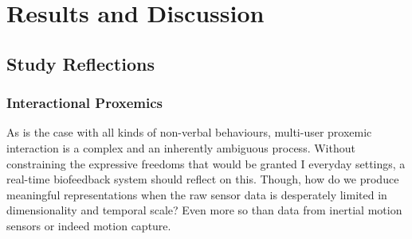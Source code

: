 








\chapter{Results and Discussion}

\section{Study Reflections}

\subsection{Interactional Proxemics}
As is the case with all kinds of non-verbal behaviours, multi-user proxemic interaction is a complex and an inherently ambiguous process. Without constraining the expressive freedoms that would be granted I everyday settings, a real-time biofeedback system should reflect on this. Though, how do we produce meaningful representations when the raw sensor data is desperately limited in dimensionality and temporal scale? Even more so than data from inertial motion sensors  or indeed motion capture.  

